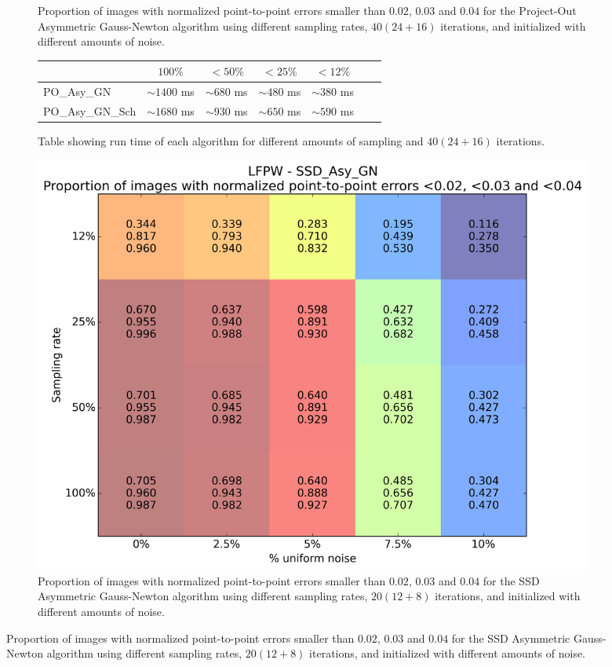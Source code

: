 \begin{figure}[h!]
\begin{subfigure}{0.48\textwidth}
	    \caption{Proportion of images with normalized point-to-point errors smaller than $0.02$, $0.03$ and $0.04$ for the Project-Out Asymmetric Gauss-Newton algorithm using different sampling rates, $40 (24 + 16)$ iterations, and initialized with different amounts of noise.}
	    \label{fig:sampling_vs_noise_po_asy_gn}
	\end{subfigure}
	\par\bigskip\bigskip
	\begin{subfigure}{\textwidth}
		\center
		\begin{tabular}{lcccccc}
		    \toprule
		    & $100\%$ & $<50\%$ & $<25\%$ & $<12\%$ 
		    \\
		    \midrule
		    PO\_Asy\_GN & $\sim1400$ ms & $\sim680$ ms & $\sim480$ ms & $\sim380$ ms
		    \\ 
		    PO\_Asy\_GN\_Sch & $\sim1680$ ms & $\sim930$ ms & $\sim650$ ms & $\sim590$ ms
		    \\
		    \bottomrule
	  	\end{tabular}
	  	\caption{Table showing run time of each algorithm for different amounts of sampling and $40 (24 + 16)$ iterations.}
	    \label{tab:runtime_40}
	\end{subfigure}
	\par\bigskip\bigskip
	\begin{subfigure}{0.48\textwidth}
	    \includegraphics[width=\textwidth]{experiments/sampling/sampling_vs_noise_ssd_asy_gn.png}
	    \caption{Proportion of images with normalized point-to-point errors smaller than $0.02$, $0.03$ and $0.04$ for the SSD Asymmetric Gauss-Newton algorithm using different sampling rates, $20 (12 + 8)$ iterations, and initialized with different amounts of noise.}

\end{subfigure}
\end{figure}
